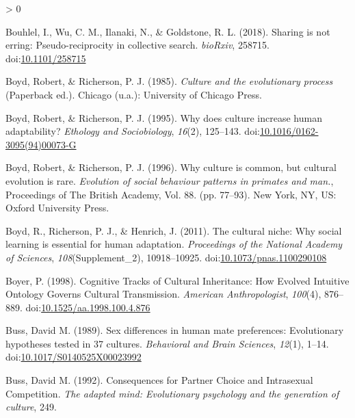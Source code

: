\documentclass[
  11pt,
]{article}
\newlength{\cslhangindent}
\newenvironment{CSLReferences}[2] %
 {%
  \setlength{\parindent}{0pt}
  \ifodd #1 \everypar{\setlength{\hangindent}{\cslhangindent}}\ignorespaces\fi
  \ifnum #2 > 0
  \setlength{\parskip}{#2\baselineskip}
  \fi
 }%
 {}
\begin{document}
\begin{CSLReferences}{1}{0}
\leavevmode\hypertarget{ref-bouhlelSharingNotErring2018}{}%
Bouhlel, I., Wu, C. M., Ilanaki, N., \& Goldstone, R. L. (2018). Sharing is not erring: {Pseudo}-reciprocity in collective search. \emph{bioRxiv}, 258715. doi:\href{https://doi.org/10.1101/258715}{10.1101/258715}

\leavevmode\hypertarget{ref-boydCultureEvolutionaryProcess1985}{}%
Boyd, Robert, \& Richerson, P. J. (1985). \emph{Culture and the evolutionary process} (Paperback ed.). {Chicago (u.a.)}: {University of Chicago Press}.

\leavevmode\hypertarget{ref-boydWhyDoesCulture1995}{}%
Boyd, Robert, \& Richerson, P. J. (1995). Why does culture increase human adaptability? \emph{Ethology and Sociobiology}, \emph{16}(2), 125--143. doi:\href{https://doi.org/10.1016/0162-3095(94)00073-G}{10.1016/0162-3095(94)00073-G}

\leavevmode\hypertarget{ref-boydWhyCultureCommon1996}{}%
Boyd, Robert, \& Richerson, P. J. (1996). Why culture is common, but cultural evolution is rare. \emph{Evolution of social behaviour patterns in primates and man.}, Proceedings of {The British Academy}, {Vol}. 88. (pp. 77--93). {New York, NY, US}: {Oxford University Press}.

\leavevmode\hypertarget{ref-boydCulturalNicheWhy2011}{}%
Boyd, R., Richerson, P. J., \& Henrich, J. (2011). The cultural niche: {Why} social learning is essential for human adaptation. \emph{Proceedings of the National Academy of Sciences}, \emph{108}(Supplement\_2), 10918--10925. doi:\href{https://doi.org/10.1073/pnas.1100290108}{10.1073/pnas.1100290108}

\leavevmode\hypertarget{ref-boyerCognitiveTracksCultural1998}{}%
Boyer, P. (1998). Cognitive {Tracks} of {Cultural Inheritance}: {How Evolved Intuitive Ontology Governs Cultural Transmission}. \emph{American Anthropologist}, \emph{100}(4), 876--889. doi:\href{https://doi.org/10.1525/aa.1998.100.4.876}{10.1525/aa.1998.100.4.876}

\leavevmode\hypertarget{ref-bussSexDifferencesHuman1989}{}%
Buss, David M. (1989). Sex differences in human mate preferences: {Evolutionary} hypotheses tested in 37 cultures. \emph{Behavioral and Brain Sciences}, \emph{12}(1), 1--14. doi:\href{https://doi.org/10.1017/S0140525X00023992}{10.1017/S0140525X00023992}

\leavevmode\hypertarget{ref-bussConsequencesPartnerChoice1992}{}%
Buss, David M. (1992). Consequences for {Partner Choice} and {Intrasexual Competition}. \emph{The adapted mind: Evolutionary psychology and the generation of culture}, 249.


\end{CSLReferences}
\end{document}
